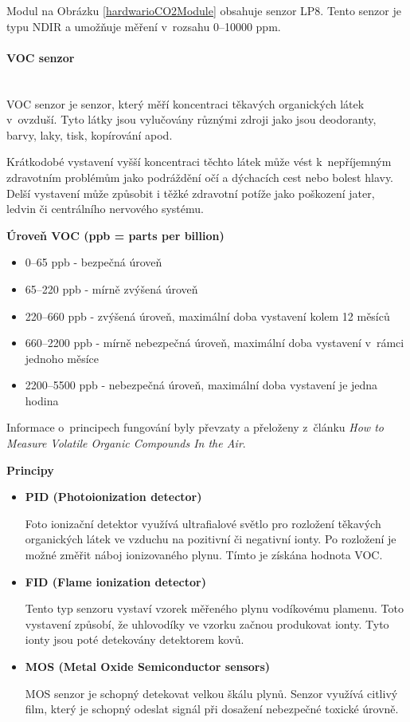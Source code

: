 Modul na Obrázku \ref{hardwarioCO2Module} obsahuje senzor LP8. Tento senzor je typu NDIR a umožňuje měření v~rozsahu 0--10000 ppm.

\paragraph*{VOC senzor}\mbox{} \\
VOC senzor je senzor, který měří koncentraci těkavých organických látek v~ovzduší. Tyto látky jsou vylučovány různými zdroji jako jsou deodoranty, barvy, laky, tisk, kopírování apod.

Krátkodobé vystavení vyšší koncentraci těchto látek může vést k~nepříjemným zdravotním problémům jako podráždění očí a dýchacích cest nebo bolest hlavy.
Delší vystavení může způsobit i těžké zdravotní potíže jako poškození jater, ledvin či centrálního nervového systému.\cite{voc-dangers}

\noindent\textbf{Úroveň VOC (ppb = parts per billion)\cite{voc-values}}
\begin{itemize}
  \item 0--65 ppb - bezpečná úroveň
  \item 65--220 ppb - mírně zvýšená úroveň
  \item 220--660 ppb - zvýšená úroveň, maximální doba vystavení kolem 12 měsíců
  \item 660--2200 ppb - mírně nebezpečná úroveň, maximální doba vystavení v~rámci jednoho měsíce
  \item 2200--5500 ppb - nebezpečná úroveň, maximální doba vystavení je jedna hodina
  \end{itemize}

Informace o~principech fungování byly převzaty a přeloženy z~článku \emph{How to Measure Volatile Organic Compounds In the Air}\cite{voc-sensor-description}.

\noindent\textbf{Principy}
\begin{itemize}
  \item \textbf{PID (Photoionization detector)}
  
  Foto ionizační detektor využívá ultrafialové světlo pro rozložení těkavých organických látek ve vzduchu na pozitivní či negativní ionty. Po rozložení je možné změřit náboj ionizovaného plynu. Tímto je získána hodnota VOC.
  \item \textbf{FID (Flame ionization detector)}
  
  Tento typ senzoru vystaví vzorek měřeného plynu vodíkovému plamenu. Toto vystavení způsobí, že uhlovodíky ve vzorku začnou produkovat ionty. Tyto ionty jsou poté detekovány detektorem kovů. 
  \item \textbf{MOS (Metal Oxide Semiconductor sensors)}
  
  MOS senzor je schopný detekovat velkou škálu plynů. Senzor využívá citlivý film, který je schopný odeslat signál při dosažení nebezpečné toxické úrovně.
  \end{itemize}

